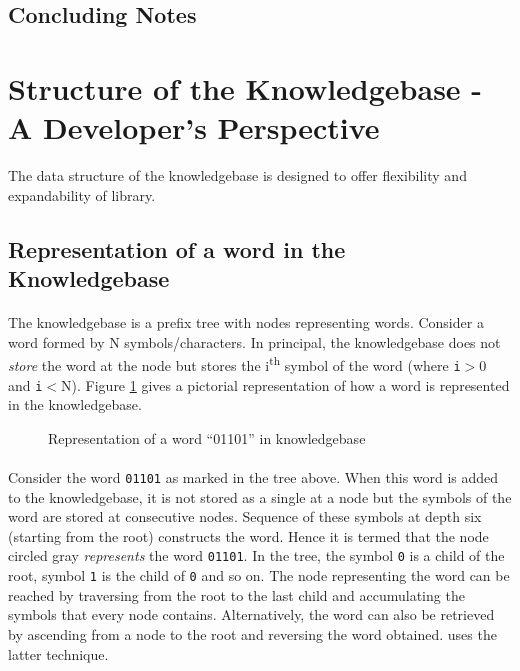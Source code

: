 \subsection*{Concluding Notes}


\section{Structure of the Knowledgebase - A Developer's Perspective}
The data structure of the knowledgebase is designed to offer flexibility and expandability of \libalf library. 

\subsection{Representation of a word in the Knowledgebase}
\paragraph{}
The knowledgebase is a prefix tree with nodes representing words. Consider a word formed by N symbols/characters. In principal, the knowledgebase does not \emph{store} the word at the node but stores the i\textsuperscript{th} symbol of the word (where \texttt{i}$>$0 and \texttt{i}$<$N). Figure \ref{knowledgebasepic} gives a pictorial representation of how a word is represented in the knowledgebase.


\begin{figure} [h]
\centering
{}
\caption{Representation of a word ``01101'' in knowledgebase}
\label{knowledgebasepic}
\end{figure}


\paragraph{}	
Consider the word \texttt{01101} as marked in the tree above. When this word is added to the knowledgebase, it is not stored as a single \stringtype at a node but the symbols of the word are stored at consecutive nodes. Sequence of these symbols at depth six (starting from the root) constructs the word. Hence it is termed that the node circled gray \emph{represents} the word \texttt{01101}. In the tree, the symbol \texttt{0} is a child of the root, symbol \texttt{1} is the child of \texttt{0} and so on. The node representing the word can be reached by traversing from the root to the last child and accumulating the symbols that every node contains. Alternatively, the word can also be retrieved by ascending from a node to the root and reversing the word obtained. \libalf uses the latter technique. 
\vskip 1pt
	
